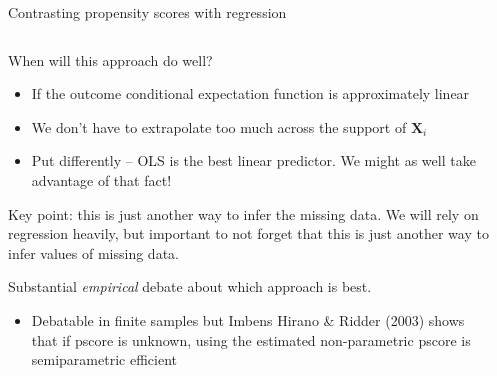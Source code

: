 \documentclass[notes,11pt, aspectratio=169]{beamer}
\newenvironment{wideitemize}{\itemize\addtolength{\itemsep}{10pt}}{\enditemize}
\begin{document}
\begin{frame}{Contrasting propensity scores with regression}
\begin{columns}[T] %
\begin{column}{.8\textwidth}

  \begin{wideitemize}
  \item When will this approach do well?
    \begin{itemize}
    \item If the outcome conditional expectation function is approximately linear
    \item We don't have to extrapolate too much across the support of $\mathbf{X}_{i}$
    \item Put differently -- OLS is the best linear predictor. We might as well take advantage of that fact!
    \end{itemize}
  \item Key point: this is just another way to infer the missing
    data. We will rely on regression heavily, but important to not
    forget that this is just another way to infer values of missing
    data.
  \item Substantial \emph{empirical} debate about which approach is best.
    \begin{itemize}
    \item Debatable in finite samples but Imbens Hirano \& Ridder
      (2003) shows that if pscore is unknown, using the estimated
      non-parametric pscore is semiparametric efficient
    \end{itemize}
  \end{wideitemize}
\end{column}%
\hfill%
\begin{column}{.4\textwidth}

\end{column}%
\end{columns}
\end{frame}
\end{document}
